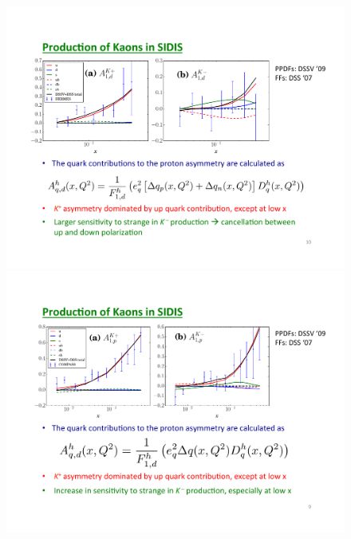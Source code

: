 \begin{figure} [!htbp]
\begin{minipage}[t]{0.5\linewidth}
\includegraphics[width=\linewidth]{dis/Kplusd.pdf}
\end{minipage}%
\begin{minipage}[t]{0.5\linewidth}
\includegraphics[width=\linewidth]{dis/Kminusp.pdf}
\end{minipage}
\begin{minipage}[b]{\linewidth}

\end{minipage}
\end{figure}
